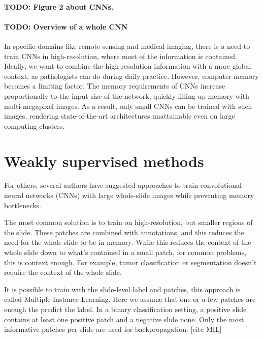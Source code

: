 \documentclass[
  12pt,
  a5,margin=2cmpaper,
]{article}
\begin{document}
\hypertarget{todo-figure-2-about-cnns.}{%
\paragraph{TODO: Figure 2 about CNNs.}\label{todo-figure-2-about-cnns.}}

\hypertarget{todo-overview-of-a-whole-cnn}{%
\paragraph{TODO: Overview of a whole
CNN}\label{todo-overview-of-a-whole-cnn}}

In specific domains like remote sensing and medical imaging, there is a
need to train CNNs in high-resolution, where most of the information is
contained. Ideally, we want to combine the high-resolution information
with a more global context, as pathologists can do during daily
practice. However, computer memory becomes a limiting factor. The memory
requirements of CNNs increase proportionally to the input size of the
network, quickly filling up memory with multi-megapixel images. As a
result, only small CNNs can be trained with such images, rendering
state-of-the-art architectures unattainable even on large computing
clusters.

\hypertarget{weakly-supervised-methods}{%
\section{Weakly supervised methods}\label{weakly-supervised-methods}}

For others, several authors have suggested approaches to train
convolutional neural networks (CNNs) with large whole-slide images while
preventing memory bottlenecks.

The most common solution is to train on high-resolution, but smaller
regions of the slide. These patches are combined with annotations, and
this reduces the need for the whole slide to be in memory. While this
reduces the context of the whole slide down to what's contained in a
small patch, for common problems, this is context enough. For example,
tumor classification or segmentation doesn't require the context of the
whole slide.

It is possible to train with the slide-level label and patches, this
approach is called Multiple-Instance Learning. Here we assume that one
or a few patches are enough the predict the label. In a binary
classification setting, a positive slide contains at least one positive
patch and a negative slide none. Only the most informative patches per
slide are used for backpropagation. {[}cite MIL{]}
\end{document}
